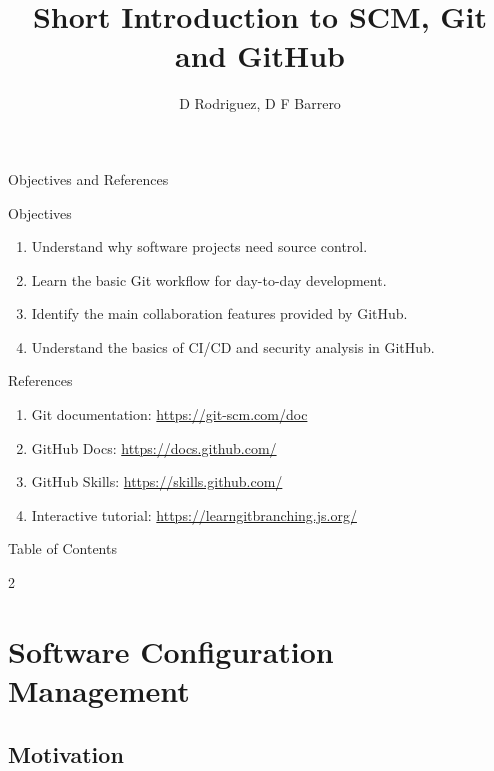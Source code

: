 \documentclass[10pt,compress]{beamer}
\title[Git]{Short Introduction to SCM, Git and GitHub}
\author{D Rodriguez, D F Barrero}
\institute{University of Alcala, UAH, Spain}
\date{}
\begin{document}
\begin{frame}
    \titlepage
\end{frame}

\begin{frame}{Objectives and References}
   \begin{block}{Objectives}
      \begin{enumerate}
         \item Understand why software projects need source control.
         \item Learn the basic Git workflow for day-to-day development.
         \item Identify the main collaboration features provided by GitHub.
            \item Understand the basics of CI/CD and security analysis in GitHub.
      \end{enumerate}
   \end{block}

   \begin{block}{References}
      \begin{enumerate}
          \item Git documentation: \url{https://git-scm.com/doc}
          \item GitHub Docs: \url{https://docs.github.com/}
          \item GitHub Skills: \url{https://skills.github.com/}
          \item Interactive tutorial: \url{https://learngitbranching.js.org/}
      \end{enumerate}
   \end{block}
\end{frame}

\begin{frame}[shrink]{Table of Contents}
 \begin{multicols}{2}
 \tableofcontents
 \end{multicols}
\end{frame}

\section{Software Configuration Management}

\subsection{Motivation}
\end{document}
